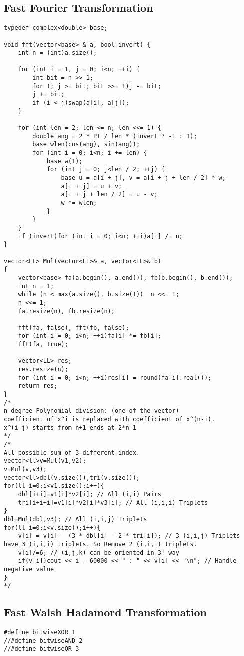 \documentclass[10pt,a4paper,onesided]{article}
\begin{document}
\begin{multicols*}{3}
\subsection{Fast Fourier Transformation}
\begin{lstlisting}
typedef complex<double> base;

void fft(vector<base> & a, bool invert) {
    int n = (int)a.size();

    for (int i = 1, j = 0; i<n; ++i) {
        int bit = n >> 1;
        for (; j >= bit; bit >>= 1)j -= bit;
        j += bit;
        if (i < j)swap(a[i], a[j]);
    }

    for (int len = 2; len <= n; len <<= 1) {
        double ang = 2 * PI / len * (invert ? -1 : 1);
        base wlen(cos(ang), sin(ang));
        for (int i = 0; i<n; i += len) {
            base w(1);
            for (int j = 0; j<len / 2; ++j) {
                base u = a[i + j], v = a[i + j + len / 2] * w;
                a[i + j] = u + v;
                a[i + j + len / 2] = u - v;
                w *= wlen;
            }
        }
    }
    if (invert)for (int i = 0; i<n; ++i)a[i] /= n;
}

vector<LL> Mul(vector<LL>& a, vector<LL>& b)
{
    vector<base> fa(a.begin(), a.end()), fb(b.begin(), b.end());
    int n = 1;
    while (n < max(a.size(), b.size()))  n <<= 1;
    n <<= 1;
    fa.resize(n), fb.resize(n);

    fft(fa, false), fft(fb, false);
    for (int i = 0; i<n; ++i)fa[i] *= fb[i];
    fft(fa, true);

    vector<LL> res;
    res.resize(n);
    for (int i = 0; i<n; ++i)res[i] = round(fa[i].real());
    return res;
}
/*
n degree Polynomial division: (one of the vector)
coefficient of x^i is replaced with coefficient of x^(n-i).
x^(i-j) starts from n+1 ends at 2*n-1
*/
/*
All possible sum of 3 different index.
vector<ll>v=Mul(v1,v2);
v=Mul(v,v3);
vector<ll>dbl(v.size()),tri(v.size());
for(ll i=0;i<v1.size();i++){
    dbl[i+i]=v1[i]*v2[i]; // All (i,i) Pairs
    tri[i+i+i]=v1[i]*v2[i]*v3[i]; // All (i,i,i) Triplets
}
dbl=Mul(dbl,v3); // All (i,i,j) Triplets
for(ll i=0;i<v.size();i++){
    v[i] = v[i] - (3 * dbl[i] - 2 * tri[i]); // 3 (i,i,j) Triplets have 3 (i,i,i) triplets. So Remove 2 (i,i,i) triplets.
    v[i]/=6; // (i,j,k) can be oriented in 3! way
    if(v[i])cout << i - 60000 << " : " << v[i] << "\n"; // Handle negative value
}
*/

\end{lstlisting}
\subsection{Fast Walsh Hadamord Transformation}
\begin{lstlisting}
#define bitwiseXOR 1
//#define bitwiseAND 2
//#define bitwiseOR 3


\end{lstlisting}
\end{multicols*}
\end{document}
